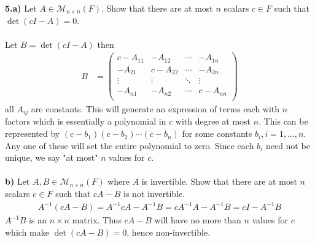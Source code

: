 \documentclass[11pt]{amsart}
\theoremstyle{definition}  %
\begin{document}
\newpage
\vskip 0.1cm
\noindent
{\bf 5.a)} Let $A \in \mathcal{M}_{n \times n}(F)$. Show that there are at most $n$ scalars $c \in F$ such that $\det(cI - A) = 0$. \\
\\
Let $B = \det(cI-A)$ then 
\begin{align*}
	B &= \begin{pmatrix}
		c-A_{11} & -A_{12} & \cdots & -A_{1n}\\
		-A_{21} & c-A_{22} & \cdots & -A_{2n}\\
		\vdots & \vdots & \ddots & \vdots \\
		-A_{n1} & -A_{n2} & \cdots & c-A_{nn}\\
	\end{pmatrix}
\end{align*}all $A_{ij}$ are constants. This will generate an expression of terms each with $n$ factors which is essentially a polynomial in $c$ with degree at most $n$.  This can be represented by $(c-b_1)(c-b_2)\cdots(c-b_n)$ for some constants $b_i, i=1,\dots, n$.  Any one of these will set the entire polynomial to zero.  Since each $b_i$ need not be unique, we say "at most" $n$ values for $c$.\\
\\
{\bf b)} Let $A, B\in \mathcal{M}_{n \times n}(F)$ where $A$ is invertible. Show that there are at most $n$ scalars $c \in F$ such that $cA - B$ is not invertible.
\\
\begin{align*}
	A^{-1}(cA-B) = A^{-1}cA-A^{-1}B = cA^{-1}A-A^{-1}B = cI-A^{-1}B 
\end{align*}$A^{-1}B$ is an $n\times n$ matrix.  Thus $cA-B$ will have no more than $n$ values for $c$ which make $\det(cA-B)=0$, hence non-invertible.
 \\
\end{document}
